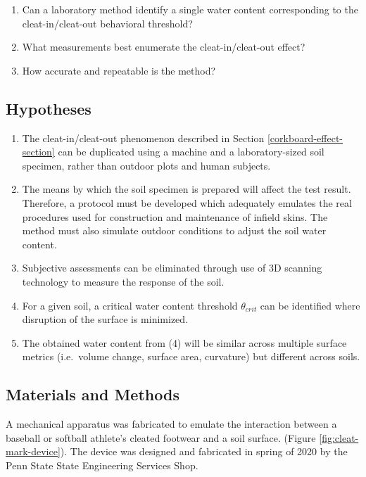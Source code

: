 \documentclass[
  letterpaper,
  openany]{book}
\providecommand{\tightlist}{%
  \setlength{\itemsep}{0pt}\setlength{\parskip}{0pt}}
\begin{document}
\begin{enumerate}
\def\labelenumi{\arabic{enumi}.}
\tightlist
\item
  Can a laboratory method identify a single water content corresponding to the cleat-in/cleat-out behavioral threshold?
\item
  What measurements best enumerate the cleat-in/cleat-out effect?
\item
  How accurate and repeatable is the method?
\end{enumerate}

\hypertarget{hypotheses}{%
\subsection{Hypotheses}\label{hypotheses}}

\begin{enumerate}
\def\labelenumi{\arabic{enumi}.}
\tightlist
\item
  The cleat-in/cleat-out phenomenon described in Section \ref{corkboard-effect-section} can be duplicated using a machine and a laboratory-sized soil specimen, rather than outdoor plots and human subjects.
\item
  The means by which the soil specimen is prepared will affect the test result. Therefore, a protocol must be developed which adequately emulates the real procedures used for construction and maintenance of infield skins. The method must also simulate outdoor conditions to adjust the soil water content.
\item
  Subjective assessments can be eliminated through use of 3D scanning technology to measure the response of the soil.
\item
  For a given soil, a critical water content threshold \(\theta_{crit}\) can be identified where disruption of the surface is minimized.
\item
  The obtained water content from (4) will be similar across multiple surface metrics (i.e.~volume change, surface area, curvature) but different across soils.
\end{enumerate}

\hypertarget{materials-and-methods}{%
\subsection{Materials and Methods}\label{materials-and-methods}}

A mechanical apparatus was fabricated to emulate the interaction between a baseball or softball athlete's cleated footwear and a soil surface. (Figure \ref{fig:cleat-mark-device}). The device was designed and fabricated in spring of 2020 by the Penn State State Engineering Services Shop.
\end{document}
